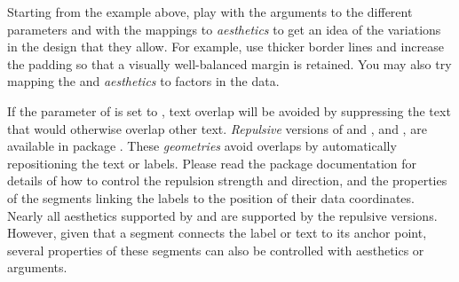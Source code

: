 \documentclass[krantz2]{krantz}\usepackage{knitr}
\begin{document}
\begin{playground}
Starting from the example above, play with the arguments to the different parameters and with the mappings to \emph{aesthetics} to get an idea of the variations in the design that they allow. For example, use thicker border lines and increase the padding so that a visually well-balanced margin is retained. You may also try mapping the  and  \emph{aesthetics} to factors in the data.
\end{playground}

If the parameter  of  is set to , text overlap will be avoided by suppressing the text that would otherwise overlap other text.  \emph{Repulsive} versions of  and ,  and , are available in package . These \emph{geometries} avoid overlaps by automatically repositioning the text or labels. Please read the package documentation for details of how to control the repulsion strength and direction, and the properties of the segments linking the labels to the position of their data coordinates. Nearly all aesthetics supported by  and  are supported by the repulsive versions. However, given that a segment connects the label or text to its anchor point, several properties of these segments can also be controlled with aesthetics or arguments.
\end{document}
